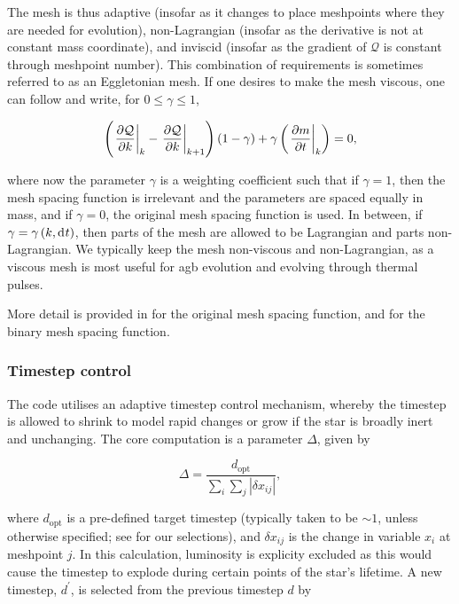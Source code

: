 The mesh is thus adaptive (insofar as it changes to place meshpoints where they are needed for evolution), non-Lagrangian (insofar as the derivative is not at constant mass coordinate), and inviscid (insofar as the gradient of $\mathcal{Q}$ is constant through meshpoint number). This combination of requirements is sometimes referred to as an Eggletonian mesh. If one desires to make the mesh viscous, one can follow \citet{Stancliffe:2004} and write, for $0\leq\gamma\leq1$,

\begin{equation}
    \pqty{\eval{\pdv{\mathcal{Q}}{k}}{k}-\eval{\pdv{\mathcal{Q}}{k}}{k+1}}\pqty{1-\gamma} + \gamma\pqty{\eval{\pdv{m}{t}}{k}} = 0,
\end{equation}

where now the parameter $\gamma$ is a weighting coefficient such that if $\gamma=1$, then the mesh spacing function is irrelevant and the parameters are spaced equally in mass, and if $\gamma=0$, the original mesh spacing function is used. In between, if $\gamma=\gamma\pqty{k, \dd{t}}$, then parts of the mesh are allowed to be Lagrangian and parts non-Lagrangian. We typically keep the mesh non-viscous and non-Lagrangian, as a viscous mesh is most useful for \gls{agb} evolution and evolving through thermal pulses.

More detail is provided in \citet{Eggleton:1971} for the original mesh spacing function, and \citet{Stancliffe:2004} for the binary mesh spacing function.

\subsubsection{Timestep control}

The  code utilises an adaptive timestep control mechanism, whereby the timestep is allowed to shrink to model rapid changes or grow if the star is broadly inert and unchanging. The core computation is a parameter $\Delta$, given by

\begin{equation}
    \Delta = \frac{d_\text{opt}}{\sum_i \sum_j \left|\delta x_{ij}\right|},\label{eq:timestep_selection}
\end{equation}

where $d_\text{opt}$ is a pre-defined target timestep (typically taken to be $\sim 1$, unless otherwise specified; see  for our selections), and $\delta x_{ij}$ is the change in variable $x_i$ at meshpoint $j$. In this calculation, luminosity is explicity excluded as this would cause the timestep to explode during certain points of the star's lifetime. A new timestep, $d^\prime$, is selected from the previous timestep $d$ by

